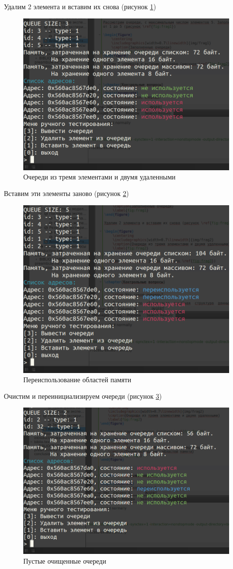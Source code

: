 Удалим 2 элемента и вставим их снова (рисунок \ref{fig:frag2})

\begin{figure}
	\centering
	\includegraphics[width=0.6\linewidth]{img/frag2}
	\caption{Очереди из тремя элементами и двумя удаленными}
	\label{fig:frag2}
\end{figure}

\clearpage

Вставим эти элементы заново (рисунок \ref{fig:frag3})

\begin{figure}
	\centering
	\includegraphics[width=0.6\linewidth]{img/frag3}
	\caption{Переиспользование областей памяти}
	\label{fig:frag3}
\end{figure}

Очистим и переинициализируем очереди (рисунок \ref{fig:frag4})

\begin{figure}
	\centering
	\includegraphics[width=0.6\linewidth]{img/frag4}
	\caption{Пустые очищенные очереди}
	\label{fig:frag4}
\end{figure}

